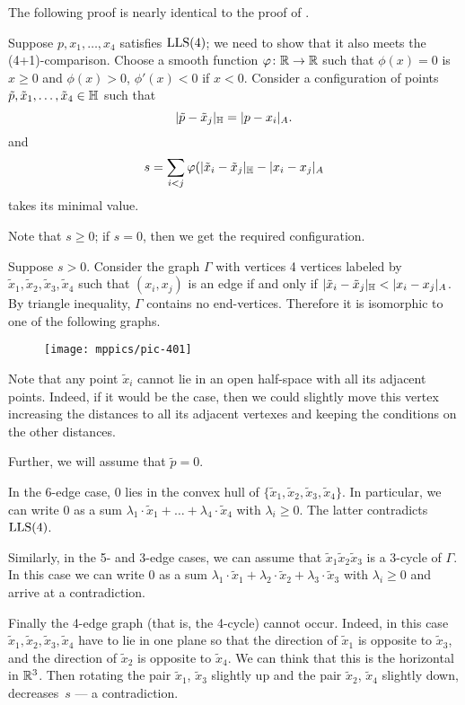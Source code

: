 \documentclass{article}
\begin{document}
The following proof is nearly identical to the proof of \cite[Proposition 4.1]{lebedeva-petrunin-zolotov}.

Suppose $p,x_1,\dots,x_4$ satisfies $\mathrm{LLS}(4)$;
we need to show that it also meets the (4+1)-comparison.
Choose a smooth function $\varphi\colon\mathbb{R}\to \mathbb{R}$ such that $\phi(x)=0$ is $x\ge0$ and $\phi(x)>0$, $\phi'(x)<0$ if $x<0$.
Consider a configuration of points $\tilde p,\tilde x_1,\dots,\tilde x_4\in \mathbb H$ such that 
\[
|\tilde p-\tilde x_j|_{\mathbb H}=|p-x_i|_{A}.
\]
and
\[
s=\sum_{i<j}\varphi(|\tilde x_i-\tilde x_j|_{\mathbb H}- |x_i-x_j|_{A}
\]
takes its minimal value.

Note that $s\ge0$;
if $s=0$, then we get the required configuration.

Suppose $s>0$.
Consider the graph $\Gamma$ with vertices 4 vertices labeled by $\tilde x_1,\tilde x_2,\tilde x_3,\tilde x_4$ such that 
$(x_i,x_j)$ is an edge if and only if $|\tilde x_i-\tilde x_j|_{\HH}<|x_i-x_j|_{A}$.
By triangle inequality, $\Gamma$ contains no end-vertices.
Therefore it is isomorphic to one of the following graphs.

\begin{figure}[ht!]
\centering
\texttt{[image: mppics/pic-401]}
\end{figure}

Note that any point $\tilde x_i$ cannot lie in an open half-space with all its
adjacent points.
Indeed, if it would be the case, then we could slightly move this
vertex increasing the distances to all its adjacent vertexes and keeping the conditions on the other distances.

Further, we will assume that $\tilde p=0$.

In the 6-edge case, $0$ lies in the convex hull of $\{\tilde x_1,\tilde x_2,\tilde x_3,\tilde x_4\}$.
In particular, we can write $0$ as a sum $\lambda_1\cdot \tilde x_1+\dots+\lambda_4\cdot\tilde x_4$ with $\lambda_i\ge0$.
The latter contradicts $\mathrm{LLS}(4)$.

Similarly, in the 5- and 3-edge cases, we can assume that $\tilde x_1\tilde x_2\tilde x_3$ is a 3-cycle of $\Gamma$.
In this case we can write $0$ as a sum $\lambda_1\cdot \tilde x_1+\lambda_2\cdot\tilde x_2+\lambda_3\cdot\tilde x_3$ with $\lambda_i\ge0$ and arrive at a contradiction.

Finally the 4-edge graph (that is, the 4-cycle) cannot occur.
Indeed, in this case $\tilde x_1,\tilde x_2,\tilde x_3,\tilde x_4$ have to lie in one plane so that the direction of $\tilde x_1$ is opposite to $\tilde x_3$,
and the direction of $\tilde x_2$ is opposite to $\tilde x_4$.
We can think that this is the horizontal in $\mathbb{R}^3$.
Then rotating the pair $\tilde x_1$, $\tilde x_3$ slightly up and 
the pair $\tilde x_2$, $\tilde x_4$  slightly down, decreases~$s$ --- a contradiction.
\qeds
\end{document}
